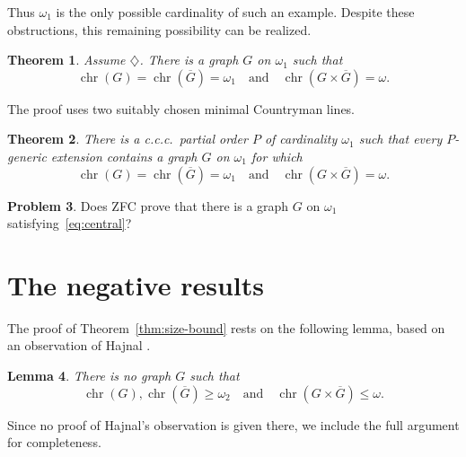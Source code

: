 \documentclass[10pt,a4paper]{amsart}
\numberwithin{equation}{section}
\newtheorem{theorem}{Theorem}[section]
\newtheorem{lemma}[theorem]{Lemma}
\theoremstyle{definition}
\newtheorem{problem}[theorem]{Problem}
\theoremstyle{remark}
\newcommand{\chr}{\operatorname{chr}}
\begin{document}
Thus $\omega_1$ is the only possible cardinality of such an example.
Despite these obstructions, this remaining possibility can be
realized.

\begin{theorem}\label{thm:diamond}
Assume $\diamondsuit$.  There is a graph $G$ on $\omega_1$ such that
\begin{displaymath}
 \chr(G)=\chr(\overline G)=\omega_1
 \quad\text{and}\quad
 \chr(G\times\overline G)=\omega.
\end{displaymath}
\end{theorem}

The proof uses two suitably chosen minimal Countryman lines.

\begin{theorem}\label{thm:main}
There is a c.c.c.\ partial order $P$ of cardinality $\omega_1$ such
that every $P$-generic extension contains a graph $G$ on $\omega_1$
for which
\begin{displaymath}
 \chr(G)=\chr(\overline G)=\omega_1
 \quad\text{and}\quad
 \chr(G\times\overline G)=\omega.
\end{displaymath}
\end{theorem}

\begin{problem}\label{q:zfc}
Does ZFC prove that there is a graph $G$ on $\omega_1$
satisfying~\eqref{eq:central}?
\end{problem}

\section{The negative results}

The proof of Theorem~\ref{thm:size-bound} rests on the following lemma,
based on an observation of Hajnal \cite{Hajnal1985}.


\begin{lemma}\label{lem:bound}
There is no graph $G$ such that
\begin{displaymath}
 \chr(G),\chr(\overline G)\geq\omega_2
 \quad\text{and}\quad
 \chr(G\times\overline G)\leq\omega.
\end{displaymath}
\end{lemma}

Since no proof of Hajnal's observation is given there, we include the
full argument for completeness.
\end{document}
